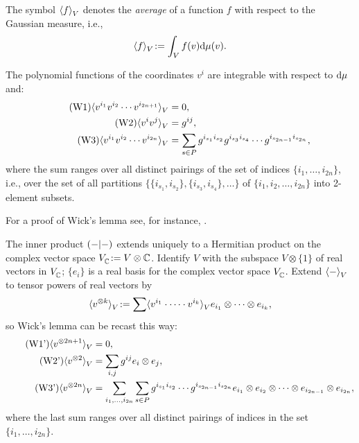 The symbol $\langle f \rangle_{V}^{}$ denotes the \emph{average} of a function $f$
with respect to the Gaussian measure, i.e.,
\begin{equation*}
  \avg{f} \joinrel:= \int_V f(v)\ud\mu(v).
\end{equation*}

\begin{lemma}[Wick]
  The polynomial functions of the coordinates $v^i$ are integrable
  with respect to $\mathrm{d}\mu$ and:
  \begin{align}
    \tag{W1}
    \langle v^{i_1}v^{i_2}\cdots
      v^{i_{2n+1}} \rangle_{V}^{} &= 0,
    \\
    \tag{W2}
    \langle v^{i}v^{j} \rangle_{V}^{} &= g^{ij},
    \\
    \tag{W3}
    \langle v^{i_1}v^{i_2}\cdots
      v^{i_{2n}} \rangle_{V}^{} &= \sum\limits_{s\in P}
    g^{i_{s_1} i_{s_2}} g^{i_{s_3} i_{s_4}} \cdots
    g^{i_{s_{2n-1}} i_{s_{2n}}}, 
  \end{align}
  where the sum ranges over all distinct pairings of the set of
  indices $\{i_1,\dots,i_{2n}\}$, i.e., over the set of all partitions
  $\bigl\{\{i_{s_1},i_{s_2}\},\{i_{s_3},i_{s_4}\},\dots\bigr\}$ of
  $\{i_1,i_2,\dots,i_{2n}\}$ into 2-element subsets.
\end{lemma}
For a proof of Wick's lemma see, for instance,
\cite{bessis-itzykson-zuber;graphical-enumeration}.

The inner product $( -|- )_{}$ extends uniquely to a Hermitian
product on the complex vector space $\cplx{V} \joinrel:= V \otimes \setC$.
Identify $V$ with the subspace $V \otimes \{1\}$ of real vectors in
$V^{}_{\mathbb{C}}$; $\{ e_i \}$ is a real basis for the complex vector
space $V^{}_{\mathbb{C}}$. Extend $\langle - \rangle_{V}^{}$ to tensor powers of real
vectors by
\begin{equation*}
  \label{eq:avg-x}
  \avg{v\tp{k}} \joinrel:= \sum \avg{v^{i_1} \cdot \cdots \cdot v^{i_k}}
  e_{i_1} \otimes \cdots \otimes e_{i_k},
\end{equation*}
so Wick's lemma can be recast this way:
\begin{align}
  \label{eq:W1}\tag{W1'}
  \langle v\sp{\otimes  2n+1} \rangle_{V}^{} &= 0,
  \\
  \label{eq:W2}\tag{W2'}
  \langle v\sp{\otimes  2} \rangle_{V}^{} &= \sum_{i,j} g^{ij} e_i
  \otimes e_j,
  \\
  \label{eq:W3}\tag{W3'}
  \langle v\sp{\otimes 2n} \rangle_{V}^{} &= \sum\limits_{i_1, \dots,
    i_{2n}} \sum\limits_{s\in P} g^{i_{s_1} i_{s_2}} \cdots
  g^{i_{s_{2n-1}} i_{s_{2n}}} e_{i_1} \otimes e_{i_2} \otimes \cdots
  \otimes e_{i_{2n-1}} \otimes e_{i_{2n}},
\end{align}
where the last sum ranges over all distinct pairings of indices in the
set $\{i_1, \dots, i_{2n}\}$.


